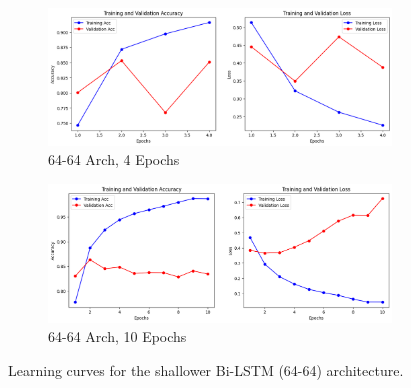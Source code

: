 \documentclass[11pt]{article}
\begin{document}
\begin{figure}[htbp]
  \centering
  \begin{subfigure}{0.3\textwidth}
    \includegraphics[width=\linewidth]{figs/4_2.png}
    \caption{64-64 Arch, 4 Epochs}
    \label{fig:lstm-64-64-4e}
  \end{subfigure}
  \hfill
  \begin{subfigure}{0.3\textwidth}
    \includegraphics[width=\linewidth]{figs/10_2.png}
    \caption{64-64 Arch, 10 Epochs}
    \label{fig:lstm-64-64-10e}
  \end{subfigure}
  \caption{Learning curves for the shallower Bi-LSTM (64-64) architecture.}
  \label{fig:lstm-64-64-curves}
\end{figure}
\end{document}
